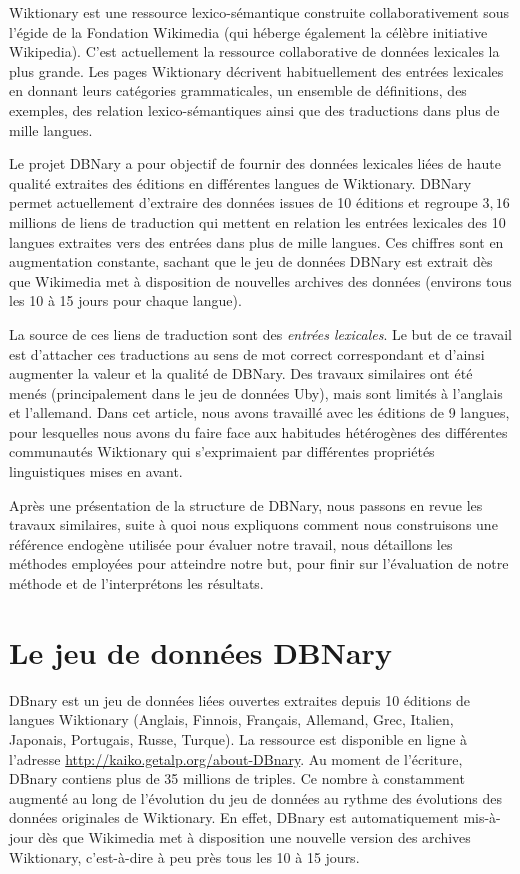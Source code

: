 \documentclass[10pt,a4paper,twoside]{article}
\begin{document}
 Wiktionary est une ressource lexico-sémantique construite collaborativement sous l'égide de la Fondation Wikimedia (qui héberge également la célèbre initiative Wikipedia). C'est actuellement la ressource collaborative de données lexicales la plus grande. Les pages Wiktionary décrivent habituellement des entrées lexicales en donnant leurs catégories grammaticales, un ensemble de définitions, des exemples, des relation lexico-sémantiques ainsi que des traductions dans plus de mille langues.

Le projet DBNary \cite{serasset:dbnary-swj} a pour objectif de fournir des données lexicales liées de haute qualité extraites des éditions en différentes langues de Wiktionary. DBNary permet actuellement d'extraire des données issues de 10 éditions et regroupe $3,16$ millions de liens de traduction qui mettent en relation les entrées lexicales des 10 langues extraites vers des entrées dans plus de mille langues. Ces chiffres sont en augmentation constante, sachant que le jeu de données DBNary est extrait dès que Wikimedia met à disposition de nouvelles archives des données (environs tous les 10 à 15 jours pour chaque langue).

La source de ces liens de traduction sont des \emph{entrées lexicales}. Le but de ce travail est d'attacher ces traductions au sens de mot correct correspondant et d'ainsi augmenter la valeur et la qualité de DBNary.
Des travaux similaires ont été menés (principalement dans le jeu de données Uby), mais sont limités à l'anglais et l'allemand. Dans cet article, nous avons travaillé avec les éditions de 9 langues, pour lesquelles nous avons du faire face aux habitudes hétérogènes des différentes communautés Wiktionary qui s'exprimaient par différentes propriétés linguistiques mises en avant. 

Après une présentation de la structure de DBNary, nous passons en revue les travaux similaires, suite à quoi nous expliquons comment nous construisons une référence endogène utilisée pour évaluer notre travail, nous détaillons les méthodes employées pour atteindre notre but, pour finir sur l'évaluation de notre méthode et de l'interprétons les résultats.

\section{Le jeu de données DBNary}

DBnary est un jeu de données liées ouvertes extraites depuis 10 éditions de langues Wiktionary (Anglais, Finnois, Français, Allemand, Grec, Italien, Japonais, Portugais, Russe, Turque). La ressource est disponible en ligne à l'adresse \url{http://kaiko.getalp.org/about-DBnary}. Au moment de l'écriture, DBnary contiens  plus de  35 millions de triples. Ce nombre à constamment augmenté au long de l'évolution du jeu de données au rythme des évolutions des données originales de Wiktionary. En effet, DBnary est automatiquement mis-à-jour dès que Wikimedia met à disposition une nouvelle version des archives Wiktionary, c'est-à-dire à peu près tous les 10 à 15 jours.
\end{document}
